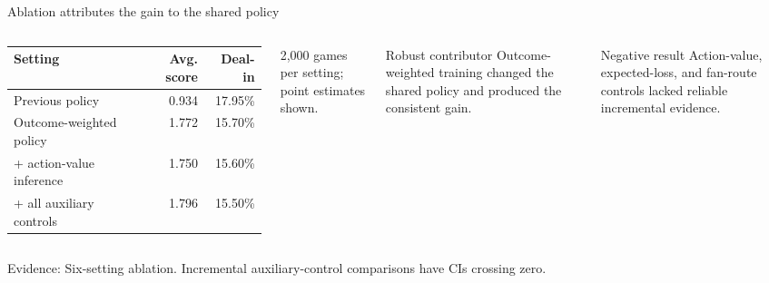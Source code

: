 \documentclass[aspectratio=169,10pt]{beamer}
\newif\ifnobackup
\newcommand{\source}[1]{%
  \vfill
  \ifnobackup\else
    {\fontsize{6.8}{8}\selectfont\color{Muted}Evidence: #1\par}
  \fi
}
\begin{document}
\begin{frame}{Ablation attributes the gain to the shared policy}
  \vspace{0.05cm}
  \begin{columns}[T,onlytextwidth]
      \centering
      \renewcommand{\arraystretch}{1.18}
      \begin{tabular}{lrr}
        \toprule
        \textbf{Setting} & \textbf{Avg. score} & \textbf{Deal-in}\\
        \midrule
        Previous policy & 0.934 & 17.95\%\\
        Outcome-weighted policy & 1.772 & 15.70\%\\
        + action-value inference & 1.750 & 15.60\%\\
        + all auxiliary controls & 1.796 & 15.50\%\\
        \bottomrule
      \end{tabular}
      \vspace{0.15cm}
      {\fontsize{7}{8}\selectfont\color{Muted}2,000 games per setting; point estimates shown.}

      \begin{block}{Robust contributor}
        Outcome-weighted training changed the shared policy and produced the consistent gain.
      \end{block}
      \vspace{0.18cm}
      \begin{exampleblock}{Negative result}
        Action-value, expected-loss, and fan-route controls lacked reliable incremental evidence.
      \end{exampleblock}
  \end{columns}
  \source{Six-setting ablation. Incremental auxiliary-control comparisons have CIs crossing zero.}
\end{frame}
\end{document}
